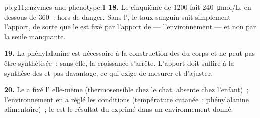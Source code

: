 \begin{solution}{pb:g11:enzymes-and-phenotype:1}
\textbf{18.} Le cinquième de \num{1200} fait
\qty{240}{\micro mol/L}, en dessous de \num{360}~: hors de danger.
Sans l', le taux sanguin suit simplement l'apport, de sorte que
le  est fixé par l'apport de  --- l'environnement ---
et non par la seule  manquante.

\textbf{19.} La phénylalanine est nécessaire à la construction des
 du corps et ne peut pas être synthétisée~; sans elle, la
croissance s'arrête. L'apport doit suffire à la synthèse des 
et pas davantage, ce qui exige de mesurer et d'ajuster.

\textbf{20.} Le  a fixé l' elle-même
(thermosensible chez le chat, absente chez l'enfant)~; l'environnement
en a réglé les conditions
(température cutanée~; phénylalanine alimentaire)~; le  est le
résultat du  exprimé dans un environnement donné.
\end{solution}
